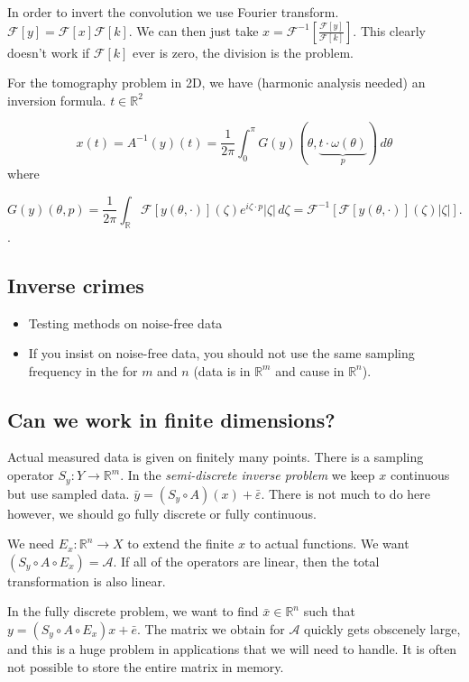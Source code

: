 \documentclass[12pt]{article}
\theoremstyle{definition}
\newcommand{\real}{\mathbb{R}}   %
\newcommand{\eps}{\varepsilon}    %
\newcommand{\Fo}{\mathscr{F}}    %
\newcommand{\F}[1]{\Fo\left[#1\right]}
\newcommand{\Fi}[1]{\Fo^{-1}\left[#1\right]}
\begin{document}
In order to invert the convolution we use Fourier transform. $\F{y}=\F{x}\F{k}$. We can then just take $x = \Fi{\frac{\F{y}}{\F{k}}}$. This clearly doesn't work if $\F{k}$ ever is zero, the division is the problem.

For the tomography problem in 2D, we have (harmonic analysis needed) an inversion formula. $t\in\real^2$

\begin{equation*}
    x(t) = A^{-1}(y)(t) = \frac{1}{2\pi}\int_0^\pi G(y)(\theta,\underbrace{t\cdot\omega(\theta)}_p) \, d\theta
\end{equation*}
where 

$$G(y)(\theta,p)= \frac{1}{2\pi}\int_\real \F{y(\theta,\cdot)}(\zeta)e^{i\zeta \cdot p}|\zeta|\, d\zeta = \Fi{\F{y(\theta,\cdot)}(\zeta) |\zeta|}.$$.

\subsection{Inverse crimes}
\begin{itemize}
    \item Testing methods on noise-free data
    \item If you insist on noise-free data, you should not use the same sampling frequency in the for $m$ and $n$ (data is in $\real^{m}$ and cause in $\real^n$).
\end{itemize}


\subsection{Can we work in finite dimensions?}
Actual measured data is given on finitely many points. There is a sampling operator $S_y:Y\to\real^m$. In the \textit{semi-discrete inverse problem} we keep $x$ continuous but use sampled data. $\bar{y} = (S_y\circ A)(x) + \bar{\eps}$. There is not much to do here however, we should go fully discrete or fully continuous.

We need $E_x:\real^n\to X$ to extend the finite $x$ to actual functions. We want $(S_y\circ A \circ E_x)= \mathcal{A}$. If all of the operators are linear, then the total transformation is also linear. 

In the fully discrete problem, we want to find $\bar{x}\in\real^n$ such that $y=(S_y\circ A\circ E_x)x + \bar{e}$. The matrix we obtain for $\mathcal{A}$ quickly gets obscenely large, and this is a huge problem in applications that we will need to handle. It is often not possible to store the entire matrix in memory.
\end{document}
